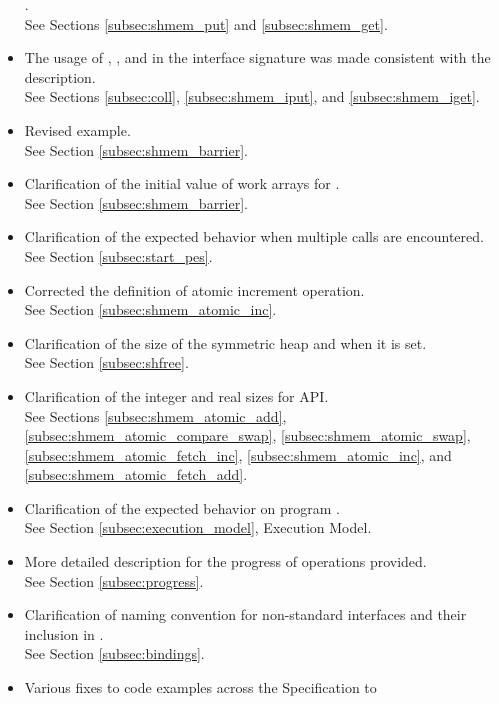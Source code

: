 \begin{itemize}
      .
\\See Sections \ref{subsec:shmem_put} and \ref{subsec:shmem_get}.
%
\item The usage of , , and  in the
      interface signature was made consistent with the description.
\\See Sections \ref{subsec:coll}, \ref{subsec:shmem_iput}, and \ref{subsec:shmem_iget}.
%
\item Revised  example.
\\See Section \ref{subsec:shmem_barrier}.
%
\item Clarification of the initial value of  work arrays for
.\\ See Section \ref{subsec:shmem_barrier}.
%
\item Clarification of the expected behavior when multiple 
calls are encountered.
\\See Section \ref{subsec:start_pes}.
%
\item Corrected the definition of atomic increment operation.
\\See Section \ref{subsec:shmem_atomic_inc}.
%
\item Clarification of the size of the symmetric heap and when it is set.
\\See Section \ref{subsec:shfree}.
%
\item Clarification of the integer and real sizes for \Fortran \ac{API}.
\\See Sections \ref{subsec:shmem_atomic_add},
      \ref{subsec:shmem_atomic_compare_swap},
      \ref{subsec:shmem_atomic_swap},
      \ref{subsec:shmem_atomic_fetch_inc},
      \ref{subsec:shmem_atomic_inc}, and
      \ref{subsec:shmem_atomic_fetch_add}.
%
\item Clarification of the expected behavior on program .
\\See Section \ref{subsec:execution_model}, Execution Model.
%
\item More detailed description for the progress of \openshmem operations
provided.
\\See Section \ref{subsec:progress}.
%
\item Clarification of naming convention for non-standard interfaces and their
inclusion in .
\\See Section \ref{subsec:bindings}.
%
\item Various fixes to \openshmem code examples across the Specification to

\end{itemize}
